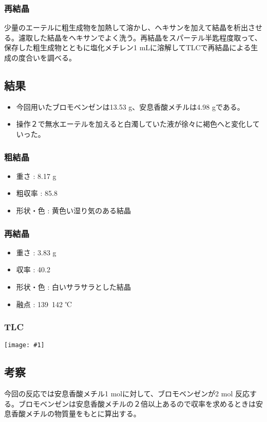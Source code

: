 \documentclass[a4paper,papersize,dvipdfmx]{jsarticle}
\newcommand{\pict}[2]{\begin{center} \texttt{[image: \#1]} \end{center}}   %
\begin{document}
\subsubsection*{再結晶}
少量のエーテルに粗生成物を加熱して溶かし、ヘキサンを加えて結晶を析出させる。濾取した結晶をヘキサンでよく洗う。再結晶をスパーテル半匙程度取って、保存した粗生成物とともに塩化メチレン1 mLに溶解してTLCで再結晶による生成の度合いを調べる。

\subsection*{結果}
\begin{itemize}
\item 今回用いたブロモベンゼンは13.53 g、安息香酸メチルは4.98 gである。
\item 操作２で無水エーテルを加えると白濁していた液が徐々に褐色へと変化していった。

\end{itemize}
\subsubsection*{粗結晶}
\begin{itemize}
\item 重さ : 8.17 g
\item 粗収率 : 85.8 %
\item 形状・色 : 黄色い湿り気のある結晶
\end{itemize}
\subsubsection*{再結晶}
\begin{itemize}
\item 重さ : 3.83 g
\item 収率 : 40.2 %
\item 形状・色 : 白いサラサラとした結晶
\item 融点 : 139~142 ℃

\end{itemize}
\subsubsection*{TLC}
\pict{imgs/4-tlc.jpeg}{4.5}

\subsection*{考察}
今回の反応では安息香酸メチル1 molに対して、ブロモベンゼンが2 mol 反応する。ブロモベンゼンは安息香酸メチルの２倍以上あるので収率を求めるときは安息香酸メチルの物質量をもとに算出する。
\end{document}
